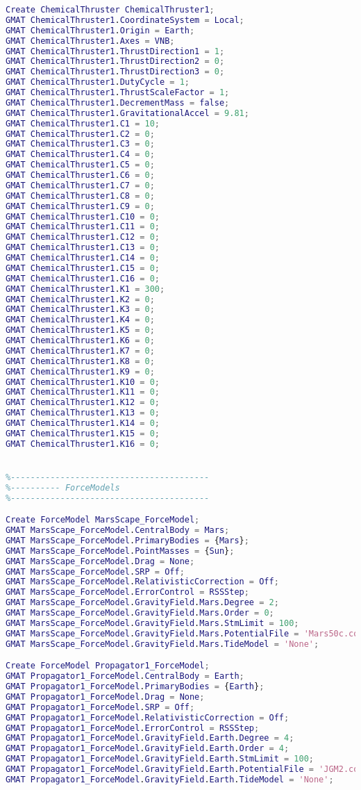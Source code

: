 \begin{lstlisting}[language=MATLAB, caption= Scrit de GMAT]
Create ChemicalThruster ChemicalThruster1;
GMAT ChemicalThruster1.CoordinateSystem = Local;
GMAT ChemicalThruster1.Origin = Earth;
GMAT ChemicalThruster1.Axes = VNB;
GMAT ChemicalThruster1.ThrustDirection1 = 1;
GMAT ChemicalThruster1.ThrustDirection2 = 0;
GMAT ChemicalThruster1.ThrustDirection3 = 0;
GMAT ChemicalThruster1.DutyCycle = 1;
GMAT ChemicalThruster1.ThrustScaleFactor = 1;
GMAT ChemicalThruster1.DecrementMass = false;
GMAT ChemicalThruster1.GravitationalAccel = 9.81;
GMAT ChemicalThruster1.C1 = 10;
GMAT ChemicalThruster1.C2 = 0;
GMAT ChemicalThruster1.C3 = 0;
GMAT ChemicalThruster1.C4 = 0;
GMAT ChemicalThruster1.C5 = 0;
GMAT ChemicalThruster1.C6 = 0;
GMAT ChemicalThruster1.C7 = 0;
GMAT ChemicalThruster1.C8 = 0;
GMAT ChemicalThruster1.C9 = 0;
GMAT ChemicalThruster1.C10 = 0;
GMAT ChemicalThruster1.C11 = 0;
GMAT ChemicalThruster1.C12 = 0;
GMAT ChemicalThruster1.C13 = 0;
GMAT ChemicalThruster1.C14 = 0;
GMAT ChemicalThruster1.C15 = 0;
GMAT ChemicalThruster1.C16 = 0;
GMAT ChemicalThruster1.K1 = 300;
GMAT ChemicalThruster1.K2 = 0;
GMAT ChemicalThruster1.K3 = 0;
GMAT ChemicalThruster1.K4 = 0;
GMAT ChemicalThruster1.K5 = 0;
GMAT ChemicalThruster1.K6 = 0;
GMAT ChemicalThruster1.K7 = 0;
GMAT ChemicalThruster1.K8 = 0;
GMAT ChemicalThruster1.K9 = 0;
GMAT ChemicalThruster1.K10 = 0;
GMAT ChemicalThruster1.K11 = 0;
GMAT ChemicalThruster1.K12 = 0;
GMAT ChemicalThruster1.K13 = 0;
GMAT ChemicalThruster1.K14 = 0;
GMAT ChemicalThruster1.K15 = 0;
GMAT ChemicalThruster1.K16 = 0;


%----------------------------------------
%---------- ForceModels
%----------------------------------------

Create ForceModel MarsScape_ForceModel;
GMAT MarsScape_ForceModel.CentralBody = Mars;
GMAT MarsScape_ForceModel.PrimaryBodies = {Mars};
GMAT MarsScape_ForceModel.PointMasses = {Sun};
GMAT MarsScape_ForceModel.Drag = None;
GMAT MarsScape_ForceModel.SRP = Off;
GMAT MarsScape_ForceModel.RelativisticCorrection = Off;
GMAT MarsScape_ForceModel.ErrorControl = RSSStep;
GMAT MarsScape_ForceModel.GravityField.Mars.Degree = 2;
GMAT MarsScape_ForceModel.GravityField.Mars.Order = 0;
GMAT MarsScape_ForceModel.GravityField.Mars.StmLimit = 100;
GMAT MarsScape_ForceModel.GravityField.Mars.PotentialFile = 'Mars50c.cof';
GMAT MarsScape_ForceModel.GravityField.Mars.TideModel = 'None';

Create ForceModel Propagator1_ForceModel;
GMAT Propagator1_ForceModel.CentralBody = Earth;
GMAT Propagator1_ForceModel.PrimaryBodies = {Earth};
GMAT Propagator1_ForceModel.Drag = None;
GMAT Propagator1_ForceModel.SRP = Off;
GMAT Propagator1_ForceModel.RelativisticCorrection = Off;
GMAT Propagator1_ForceModel.ErrorControl = RSSStep;
GMAT Propagator1_ForceModel.GravityField.Earth.Degree = 4;
GMAT Propagator1_ForceModel.GravityField.Earth.Order = 4;
GMAT Propagator1_ForceModel.GravityField.Earth.StmLimit = 100;
GMAT Propagator1_ForceModel.GravityField.Earth.PotentialFile = 'JGM2.cof';
GMAT Propagator1_ForceModel.GravityField.Earth.TideModel = 'None';


\end{lstlisting}
